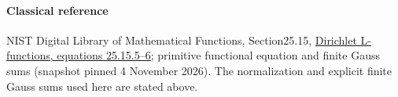 \documentclass[11pt]{article}
\begin{document}
\paragraph{Classical reference}NIST Digital Library of Mathematical Functions, Section25.15, \href{https://dlmf.nist.gov/25.15#E5}{Dirichlet L-functions, equations 25.15.5--6}; primitive functional equation and finite Gauss sums (snapshot pinned 4 November 2026). The normalization and explicit finite Gauss sums used here are stated above.
\end{document}
